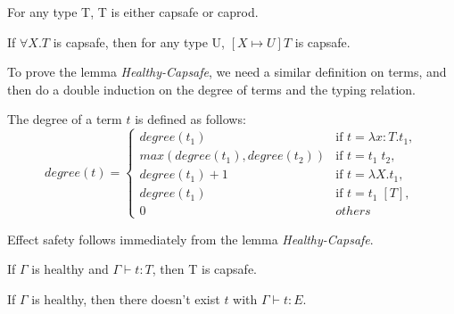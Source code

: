 \begin{lemma}
 For any type T, T is either capsafe or caprod.
\end{lemma}


\begin{lemma}
  If $\forall X.T$ is capsafe, then for any type U, $[X \mapsto U]T$
  is capsafe.
\end{lemma}

To prove the lemma \emph{Healthy-Capsafe}, we need a similar
definition on terms, and then do a double induction on the degree of
terms and the typing relation.

\begin{definition}
  The degree of a term $t$ is defined as follows:
  \begin{equation*}
    degree(t) =
    \begin{cases}
      degree(t_1) & \text{if } t = \lambda x:T.t_1,\\
      max(degree(t_1), degree(t_2)) & \text{if } t = t_1 \; t_2,\\
      degree(t_1) + 1 & \text{if } t = \lambda X.t_1,\\
      degree(t_1) & \text{if } t = t_1 \; [T],\\
      0 & others
    \end{cases}
  \end{equation*}
\end{definition}

Effect safety follows immediately from the lemma
\emph{Healthy-Capsafe}.

\begin{lemma}
  If $\Gamma$ is healthy and $\Gamma \vdash t : T$, then T is capsafe.
\end{lemma}

\begin{theorem}
  If $\Gamma$ is healthy, then there doesn't exist $t$ with
  $\Gamma \vdash t : E$.
\end{theorem}
